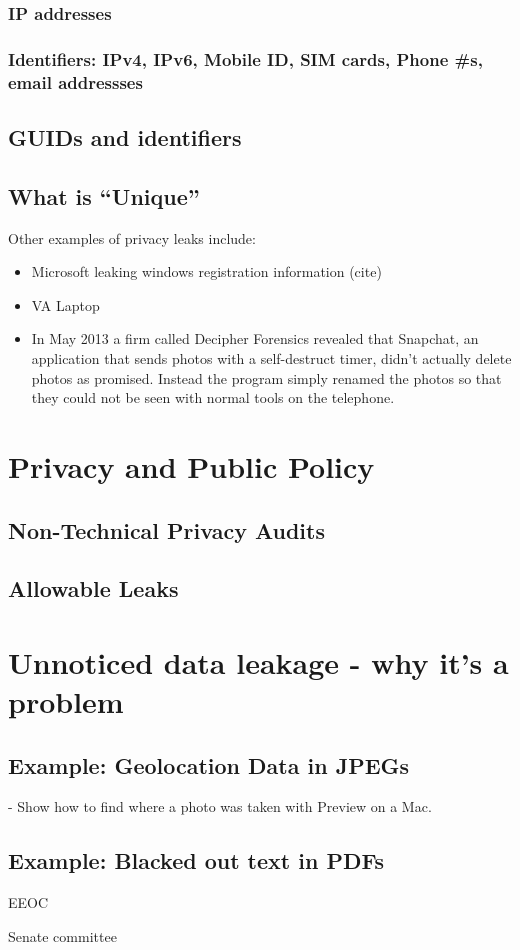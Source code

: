 \subsubsection{IP addresses}
\subsubsection{Identifiers: IPv4, IPv6, Mobile ID, SIM cards, Phone \#s, email addressses}
\subsection{GUIDs and identifiers}
\subsection{What is ``Unique''}


Other examples of privacy leaks include:
\begin{itemize}
\item Microsoft leaking windows registration information (cite)
\item VA Laptop
\item In May 2013 a firm called Decipher Forensics revealed that Snapchat, an application that sends photos with a
  self-destruct timer, didn't actually delete photos as
  promised. Instead the program simply renamed the photos so that they
  could not be seen with normal tools on the telephone\cite{ksl-snap-chat}.
\end{itemize}



\section{Privacy and Public Policy }

\subsection{Non-Technical Privacy Audits}

\subsection{Allowable Leaks}

\section{Unnoticed data leakage - why it's a problem}
\subsection{Example: Geolocation Data in JPEGs}
  - Show how to find where a photo was taken with Preview on a Mac. 
\subsection{Example: Blacked out text in PDFs}
EEOC

Senate committee

